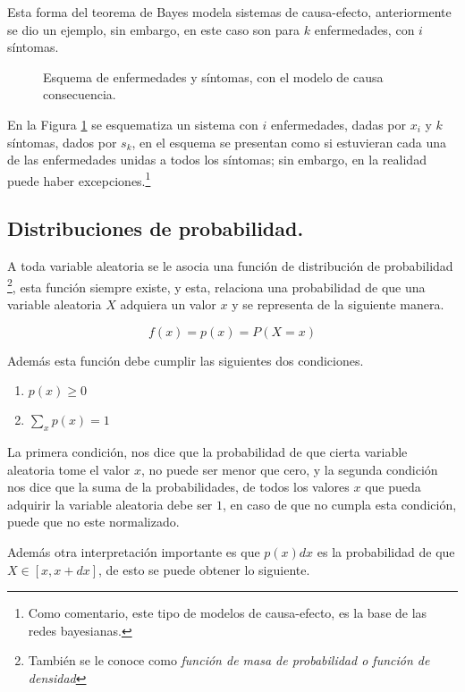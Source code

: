 Esta forma del teorema de Bayes modela sistemas de causa-efecto, anteriormente se dio un ejemplo, sin embargo, en este caso son para $k$ enfermedades, con $i$ síntomas.

\begin{figure}[!ht]
    \centering
    \scalebox{1.5}{}
    \caption{Esquema de enfermedades y síntomas, con el modelo de causa consecuencia.}
    \label{fig:Diagrama-Enf-Sin}
\end{figure}

En la Figura \ref{fig:Diagrama-Enf-Sin} se esquematiza un sistema con $i$ enfermedades, dadas por $x_i$ y $k$ síntomas, dados por $s_k$, en el esquema se presentan como si estuvieran cada una de las enfermedades unidas a todos los síntomas; sin embargo, en la realidad puede haber excepciones.\footnote{Como comentario, este tipo de modelos de causa-efecto, es la base de las redes bayesianas.}

\subsection{Distribuciones de probabilidad.}


A toda variable aleatoria se le asocia una función de distribución de probabilidad \footnote{ También se le conoce como \textit{función de masa de probabilidad o función de densidad}}, esta función siempre existe, y esta, relaciona una probabilidad de que una variable aleatoria $X$ adquiera un valor $x$ y se representa de la siguiente manera.

\begin{equation*}
    f(x) = p(x) = P(X = x)
\end{equation*}

Además esta función debe cumplir las siguientes dos condiciones.

\begin{enumerate}
    \item $p(x) \geqslant  0$
    \item $\sum_x p(x) = 1$
\end{enumerate}

La primera condición, nos dice que la probabilidad de que cierta variable aleatoria tome el valor $x$, no puede ser menor que cero, y la segunda condición nos dice que la suma de la probabilidades, de todos los valores $x$ que pueda adquirir la variable aleatoria debe ser $1$, en caso de que no cumpla esta condición, puede que no este normalizado.

Además otra interpretación importante es que $p(x)dx$ es la probabilidad de que $X\in [x,x+dx]$, de esto se puede obtener lo siguiente.

